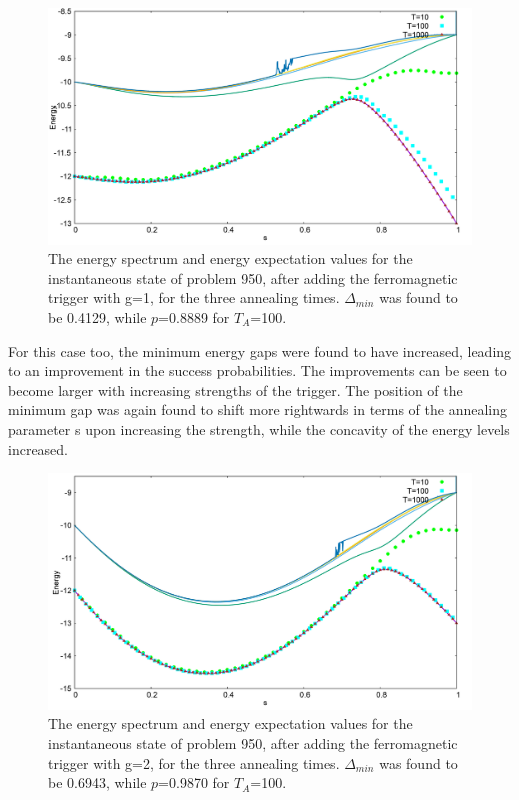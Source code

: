 \documentclass[../main.tex]{subfiles}
\begin{document}
\begin{figure}[H]
\centering 
\includegraphics[scale=0.24]{950_s12_F_g1.png}
\caption{The energy spectrum and energy expectation values for the instantaneous state of problem 950, after adding the ferromagnetic trigger with g=1, for the three annealing times. $\Delta_{min}$ was found to be 0.4129, while $p$=0.8889 for $T_A$=100.}
\label{fig:f5}
\end{figure}
For this case too, the minimum energy gaps were found to have increased, leading to an improvement in the success probabilities. The improvements can be seen to become larger with increasing strengths of the trigger. The position of the minimum gap was again found to shift more rightwards in terms of the annealing parameter s upon increasing the strength, while the concavity of the energy levels increased. \\
\begin{figure}[H]
\centering 
\includegraphics[scale=0.24]{950_s12_F_g2.png}
\caption{The energy spectrum and energy expectation values for the instantaneous state of problem 950, after adding the ferromagnetic trigger with g=2, for the three annealing times. $\Delta_{min}$ was found to be 0.6943, while $p$=0.9870 for $T_A$=100.}
\label{fig:f6}
\end{figure}
\end{document}
